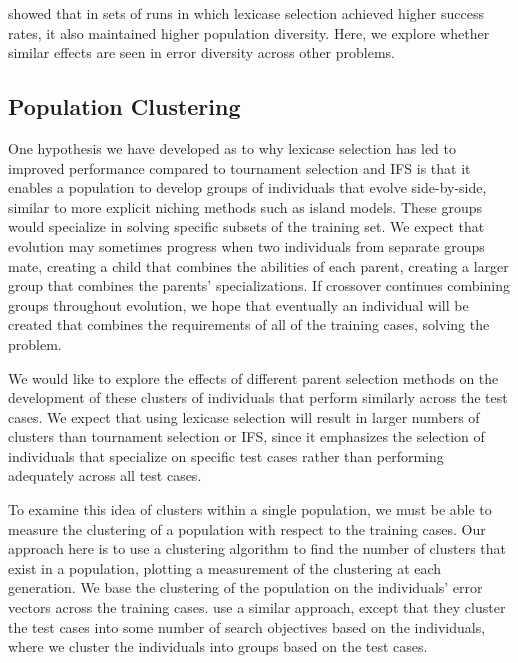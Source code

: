 \cite{Helmuth:2015:ieeeTEC} showed that in sets of runs in which lexicase selection achieved higher success rates, 
it also maintained higher population diversity. Here, we  explore whether similar 
effects are seen in error diversity across other problems.

\subsection{Population Clustering}
\label{sec:clusterCountDef}

One hypothesis we have developed as to why lexicase selection has led to improved performance compared to tournament selection and IFS is that it enables a population to develop groups of individuals that evolve side-by-side, similar to more explicit niching methods such as island models. These groups would specialize in solving specific subsets of the training set. We expect that evolution may sometimes progress when two individuals from separate groups mate, creating a child that combines the abilities of each parent, creating a larger group that combines the parents' specializations. If crossover continues combining groups throughout evolution, we hope that eventually an individual will be created that combines the requirements of all of the training cases, solving the problem.

We would like to explore the effects of different parent selection methods on the development of these clusters of individuals that perform similarly across the test cases. We expect that using lexicase selection will result in larger numbers of clusters than tournament selection or IFS, since it emphasizes the selection of individuals that specialize on specific test cases rather than performing adequately across all test cases.

To examine this idea of clusters within a single population, we must be able to measure the clustering of a population with respect to the training cases. Our approach here is to use a clustering algorithm to find the number of clusters that exist in a population, plotting a measurement of the clustering at each generation. We base the clustering of the population on the individuals' error vectors across the training cases. \cite{Krawiec:2015:EuroGP} use a similar approach, except that they cluster the test cases into some number of search objectives based on the individuals, where we cluster the individuals into groups based on the test cases.


